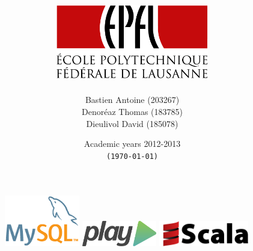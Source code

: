 \documentclass[a4paper,oneside,11pt]{report}  %
\title{{\huge \doctype}\\\vspace{1em}{\Huge \titre}\\\vspace{4em}\includegraphics[width=0.5\textwidth]{logo_epfl}}
\author{Bastien Antoine (203267)\\ Denoréaz Thomas (183785)\\ Dieulivol David (185078)}
\date{Academic years 2012-2013\\\texttt{(\today)}}
\newcommand{\insertblankpage}{\newpage\thispagestyle{empty}\mbox{}\newpage}
\begin{document}


\begin{figure}[b]
	\centering
	\includegraphics[height=6em]{logo_mysql}
	\hspace*{\fill}
	\includegraphics[height=3em]{logo_play}
	\hspace*{\fill}	
	\includegraphics[height=3em]{logo_scala}
\end{figure}

\newpage

\maketitle                                  %




\end{document}

